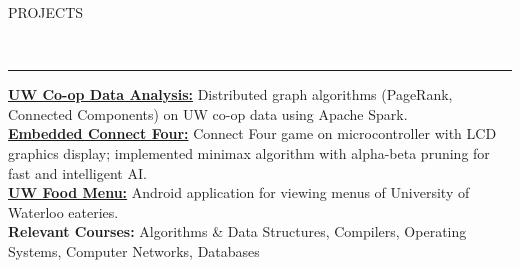 \documentclass[11pt, letterpaper, oneside]{article}
\newcommand{\HRule}[2]{\textcolor{#1}{\rule{\linewidth}{#2}}}
\newcommand{\sectiontitle}[1]{\begin{minipage}{\textwidth}\vspace{-7.5pt}\begin{flushleft}\hspace{-20.5pt}\vspace{-25pt}
\Large\MakeUppercase{#1}\end{flushleft}\end{minipage}\\\HRule{black}{0.15mm}\vspace{\baselineskip}}
\newenvironment{ressection}[1]{
  \sectiontitle{#1}}
  {\vspace{-\baselineskip}}
\begin{document}
\vspace{4pt}

\begin{ressection}{Projects}\vspace{-12pt}
  \href{https://github.com/coreywu/CoopStatsDataAnalysis}{\textbf{UW Co-op Data Analysis:}} Distributed graph algorithms (PageRank, Connected Components) on UW co-op data using Apache Spark. \vspace{4pt} \\
  \href{https://github.com/coreywu/Connect4}{\textbf{Embedded Connect Four:}} Connect Four game on microcontroller with LCD graphics display; implemented minimax algorithm with alpha-beta pruning for fast and intelligent AI.\vspace{4pt} \\
  \href{https://play.google.com/store/apps/details?id=ca.uwaterloo.uwfoodservices&hl=en}{\textbf{UW Food Menu:}} Android application for viewing menus of University of Waterloo eateries.
  \vspace{8pt}\\\hspace{-20pt} \textbf{Relevant Courses:} Algorithms \& Data Structures, Compilers, Operating Systems, Computer Networks, Databases
\end{ressection}
\end{document}
